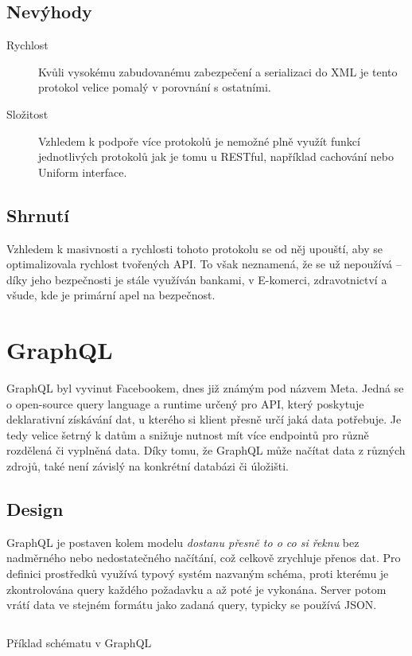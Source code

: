 \subsection{Nevýhody}
\begin{description}
    \item[Rychlost] Kvůli vysokému zabudovanému zabezpečení a serializaci do XML je tento protokol velice pomalý v porovnání s ostatními.
    \item[Složitost] Vzhledem k podpoře více protokolů je nemožné plně využít funkcí jednotlivých protokolů jak je tomu u RESTful, například cachování nebo Uniform interface.
\end{description}


\subsection{Shrnutí}
Vzhledem k masivnosti a rychlosti tohoto protokolu se od něj upouští, aby se optimalizovala rychlost tvořených API. To však neznamená, že se už nepoužívá -- díky jeho bezpečnosti je stále využíván bankami, v E-komerci, zdravotnictví a všude, kde je primární apel na bezpečnost.


\section{GraphQL}
GraphQL byl vyvinut Facebookem, dnes již známým pod názvem Meta. Jedná se o open-source query language a runtime určený pro API, který poskytuje deklarativní získávání dat, u kterého si klient přesně určí jaká data potřebuje. Je tedy velice šetrný k datům a snižuje nutnost mít více endpointů pro různě rozdělená či vyplněná data. Díky tomu, že GraphQL může načítat data z různých zdrojů, také není závislý na konkrétní databázi či úložišti.


\subsection{Design}
GraphQL je postaven kolem modelu \textit{dostanu přesně to o co si řeknu} bez nadměrného nebo nedostatečného načítání, což celkově zrychluje přenos dat. Pro definici prostředků využívá typový systém nazvaným schéma, proti kterému je zkontrolována query každého požadavku a až poté je vykonána. Server potom vrátí data ve stejném formátu jako zadaná query, typicky se používá JSON.

\begin{listing}[ht!]
    \inputminted[]{ts}{resources/code/standards/playertype.gql}
    \caption{Příklad schématu v GraphQL}
    \label{code:gql_type}
\end{listing}


